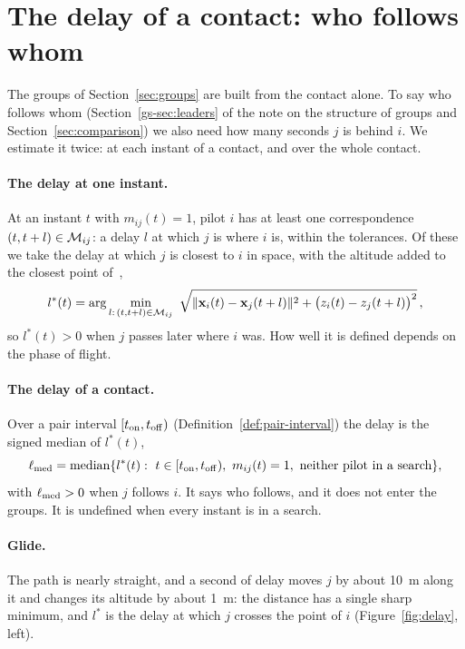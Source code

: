 \section{The delay of a contact: who follows whom}\label{sec:lag}

The groups of Section~\ref{sec:groups} are built from the contact alone. To say who follows whom
(Section~\ref{gs-sec:leaders} of the note on the structure of groups and Section~\ref{sec:comparison})
we also need how many seconds $j$ is behind $i$. We estimate it twice: at each instant of a contact, and over the whole contact.

\paragraph{The delay at one instant.} At an instant $t$ with $m_{ij}(t)=1$, pilot $i$ has at least
one correspondence $(t,t+l)\in\mathcal{M}_{ij}$: a delay $l$ at which $j$ is where $i$ is, within the
tolerances. Of these we take the delay at which $j$ is closest to $i$ in space, with the altitude
added to the closest point of~\cite{li2013},
\begin{equation}\label{eq:lstar}
  l^*(t)=\arg\min_{l:\,(t,t+l)\in\M_{ij}}\ \sqrt{\|\x_i(t)-\x_j(t+l)\|^2+\bigl(z_i(t)-z_j(t+l)\bigr)^2}\,,
\end{equation}
so $l^*(t)>0$ when $j$ passes later where $i$ was. How well it is defined depends on the phase of
flight.

\paragraph{The delay of a contact.} Over a pair interval $[t_{\rm on},t_{\rm off})$
(Definition~\ref{def:pair-interval}) the delay is the signed median of $l^*(t)$,
\begin{equation}\label{eq:lmed}
  \ell_{\rm med}=\mathrm{median}\{l^*(t):\ t\in[t_{\rm on},t_{\rm off}),\ m_{ij}(t)=1,\ \text{neither
  pilot in a search}\},
\end{equation}
with $\ell_{\rm med}>0$ when $j$ follows $i$. It says who follows, and it does not enter the groups.
It is undefined when every instant is in a search.

\paragraph{Glide.} The path is nearly straight, and a second of delay moves $j$ by about 10~m along
it and changes its altitude by about 1~m: the distance has a single sharp minimum, and $l^*$ is the
delay at which $j$ crosses the point of $i$ (Figure~\ref{fig:delay}, left).


